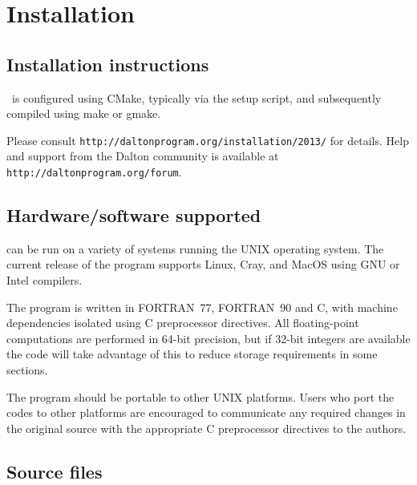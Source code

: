 \chapter{Installation}\label{ch:install}

\section{Installation instructions}

\dalton\ is configured using CMake, typically via the setup script,
and subsequently compiled using make or gmake.

Please consult \verb|http://daltonprogram.org/installation/2013/| for details.
Help and support from the Dalton community is available at \verb|http://daltonprogram.org/forum|.

\section{Hardware/software
supported}\label{sec:hardsoft}

{\dalton} can be run on a variety of systems running the UNIX operating system.
The current release of the program supports Linux, Cray, and
MacOS using GNU or Intel compilers.

The program is written in FORTRAN~77,
FORTRAN~90 and C, with machine dependencies
isolated using C preprocessor directives.  All
floating-point computations are performed in 64-bit precision, but if 32-bit
integers are available the code will take advantage of this to reduce storage
requirements in some sections.

The program should be portable to other UNIX platforms.  Users
who port the codes to other platforms are encouraged to communicate any
required changes in the original source with the appropriate C preprocessor
directives to the authors.

\section{Source files}\label{sec:source}

